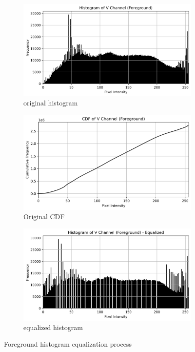 \documentclass[10pt,a4paper]{article}
\begin{document}
\begin{figure}[H]
    \centering
    \begin{subfigure}{0.24\textwidth}
        \includegraphics[width=\textwidth]{task6/6_histogram.png}
        \caption{original histogram }
    \end{subfigure}
    \begin{subfigure}{0.24\textwidth}
        \includegraphics[width=\textwidth]{task6/7_cdf.png}
        \caption{Original CDF}
    \end{subfigure}
    \begin{subfigure}{0.24\textwidth}
        \includegraphics[width=\textwidth]{task6/8_histogram_eq.png}
        \caption{equalized histogram}
    \end{subfigure}
    \caption{Foreground histogram equalization process}
\end{figure}
\end{document}
